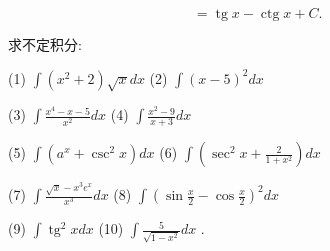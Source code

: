 \documentclass[lang=cn,newtx,10pt,scheme=chinese]{elegantbook}
\begin{document}
\[
= \operatorname{tg}x - \operatorname{ctg}x + C\text{. }
\]

\begin{problemset}[练习]

\item 求不定积分:

(1) \(\int \left( {{x}^{2} + 2}\right) \sqrt{x}{dx}\) (2) \(\int {\left( x - 5\right) }^{2}{dx}\)

(3) \(\int \frac{{x}^{4} - x - 5}{{x}^{2}}{dx}\) (4) \(\int \frac{{x}^{2} - 9}{x + 3}{dx}\)

(5) \(\int \left( {{a}^{x} + {\csc }^{2}x}\right) {dx}\) (6) \(\int \left( {{\sec }^{2}x + \frac{2}{1 + {x}^{2}}}\right) {dx}\)

(7) \(\int \frac{\sqrt{x} - {x}^{3}{e}^{x}}{{x}^{3}}{dx}\) (8) \(\int {\left( \sin \frac{x}{2} - \cos \frac{x}{2}\right) }^{2}{dx}\)

(9) \(\int {\operatorname{tg}}^{2}{xdx}\) (10) \(\int \frac{5}{\sqrt{1 - {x}^{2}}}{dx}\) .

\end{problemset}
\end{document}
